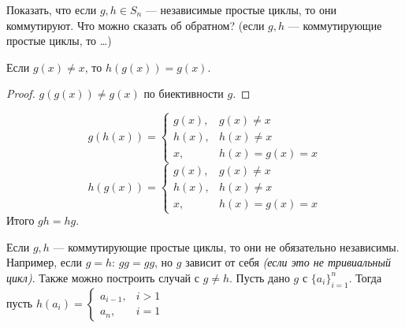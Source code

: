 \begin{exercise}
    Показать, что если \(g, h \in S_n\) --- независимые простые циклы, то они коммутируют. Что можно сказать об обратном? (если \(g, h\) --- коммутирующие простые циклы, то \dots)
\end{exercise}
\begin{solution}
    \begin{statement}
        Если \(g(x) \neq x\), то \(h(g(x)) = g(x)\).
    \end{statement}
    \begin{proof}
        \(g(g(x)) \neq g(x)\) по биективности \(g\).
    \end{proof}

    \[g(h(x)) = \begin{cases}
            g(x), & g(x) \neq x     \\
            h(x), & h(x) \neq x     \\
            x ,   & h(x) = g(x) = x
        \end{cases}\]
    \[h(g(x)) = \begin{cases}
            g(x), & g(x) \neq x     \\
            h(x), & h(x) \neq x     \\
            x ,   & h(x) = g(x) = x
        \end{cases}\]
    Итого \(gh = hg\).

    Если \(g, h\) --- коммутирующие простые циклы, то они не обязательно независимы. Например, если \(g = h\): \(gg = gg\), но \(g\) зависит от себя \textit{(если это не тривиальный цикл)}. Также можно построить случай с \(g \neq h\). Пусть дано \(g\) с \(\{a_i\}_{i = 1}^n\). Тогда пусть \(h(a_i) = \begin{cases}
        a_{i-1}, & i > 1 \\
        a_n,     & i = 1
    \end{cases}\)
\end{solution}


